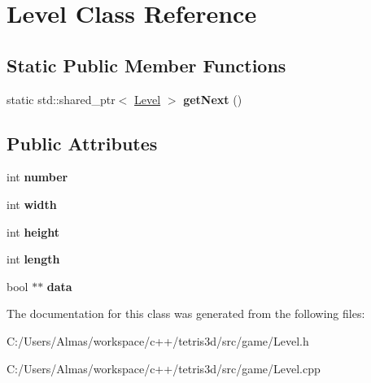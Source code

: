 \hypertarget{class_level}{\section{Level Class Reference}
\label{class_level}
}
\subsection*{Static Public Member Functions}
\begin{DoxyCompactItemize}
\item 
\hypertarget{class_level_ab70e93195f0bced15629f19d2d8b291d}{static std\-::shared\-\_\-ptr$<$ \hyperlink{class_level}{Level} $>$ {\bfseries get\-Next} ()}\label{class_level_ab70e93195f0bced15629f19d2d8b291d}

\end{DoxyCompactItemize}
\subsection*{Public Attributes}
\begin{DoxyCompactItemize}
\item 
\hypertarget{class_level_ae199a0920ceca43d88b9d58c5f77a93f}{int {\bfseries number}}\label{class_level_ae199a0920ceca43d88b9d58c5f77a93f}

\item 
\hypertarget{class_level_a33dc03f7e2e10ed198b75526d8e4e62f}{int {\bfseries width}}\label{class_level_a33dc03f7e2e10ed198b75526d8e4e62f}

\item 
\hypertarget{class_level_a16d1b735f7d513cf18bfff1ad4022f58}{int {\bfseries height}}\label{class_level_a16d1b735f7d513cf18bfff1ad4022f58}

\item 
\hypertarget{class_level_a9c1275cd0839ae9af6438b1fbd7780d1}{int {\bfseries length}}\label{class_level_a9c1275cd0839ae9af6438b1fbd7780d1}

\item 
\hypertarget{class_level_a7df9374c002c61b6efc959edfd7f39d8}{bool $\ast$$\ast$ {\bfseries data}}\label{class_level_a7df9374c002c61b6efc959edfd7f39d8}

\end{DoxyCompactItemize}


The documentation for this class was generated from the following files\-:\begin{DoxyCompactItemize}
\item 
C\-:/\-Users/\-Almas/workspace/c++/tetris3d/src/game/Level.\-h\item 
C\-:/\-Users/\-Almas/workspace/c++/tetris3d/src/game/Level.\-cpp\end{DoxyCompactItemize}
